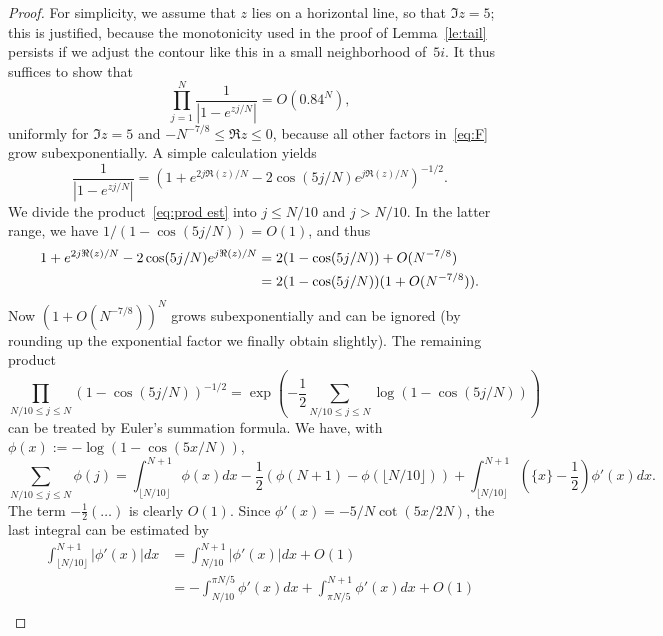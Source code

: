 \documentclass[a4paper]{amsart}
\begin{document}
\begin{proof}
For simplicity, we assume that $z$ lies on a horizontal line,
so that $\Im z=5$; this is justified, because the monotonicity
used in the proof of Lemma~\ref{le:tail} persists if we adjust the contour like
this in a small neighborhood of~$5i$.
  It thus suffices to show that
  \begin{equation}\label{eq:prod est}
      \prod_{j=1}^N \frac{1}{|1-e^{z j/N}|} = O(0.84^N),
   \end{equation}
  uniformly for $\Im z=5$ and $-N^{-7/8} \leq \Re z \leq 0$,
  because all other factors in~\eqref{eq:F} grow subexponentially.
  A simple calculation yields
  \begin{equation}\label{eq:abs expl}
    \frac{1}{|1-e^{z j/N}|} = \left(1+  e^{2j \Re(z)/N} - 2\cos(5j/N)
    e^{j \Re(z)/N} \right)^{-1/2}.
  \end{equation}
  We divide the product~\eqref{eq:prod est}
  into $j\leq N/10$ and $j>N/10$. In the latter range,
  we have $1/(1-\cos(5j/N))=O(1)$, and thus
  \begin{align}
    1+  e^{2j \Re(z)/N} - 2\cos(5j/N) e^{j \Re(z)/N}
      &= 2(1-\cos(5j/N))+ O(N^{-7/8}) \notag \\
    &= 2(1-\cos(5j/N))(1+ O(N^{-7/8})). \label{eq:j big}
  \end{align}
  Now $(1+ O(N^{-7/8}))^N$ grows subexponentially and can be ignored (by rounding
  up the exponential factor we finally obtain slightly). The remaining product
  \begin{equation}\label{eq:prod sum}
    \prod_{N/10 \leq j\leq N}(1-\cos(5j/N))^{-1/2} =
    \exp\left(-\frac12 \sum_{N/10 \leq j\leq N} \log(1-\cos(5j/N)) \right)
  \end{equation}
  can be treated by Euler's summation formula.
  We have, with $\phi(x):=-\log(1-\cos(5x/N))$,
  \begin{equation}\label{eq:euler}
    \sum_{N/10 \leq j\leq N} \phi(j) = \int_{\lfloor N/10 \rfloor}^{N+1} \phi(x)dx
    -\frac12(\phi(N+1)-\phi(\lfloor N/10 \rfloor)) +
    \int_{\lfloor N/10 \rfloor}^{N+1}(\{x\}-\frac12)\phi'(x)dx.
  \end{equation}
  The term $-\tfrac12(\dots)$ is clearly $O(1)$.
  Since $\phi'(x) = -5/N \cot(5x/2N)$, the last integral can be estimated by
  \begin{align*}
    \int_{\lfloor N/10 \rfloor}^{N+1} | \phi'(x) | dx
    &= \int_{ N/10 }^{N+1} | \phi'(x) | dx  + O(1) \\
    &= -\int_{ N/10 }^{\pi N/5}\phi'(x) dx + \int_{\pi N/5}^{N+1}\phi'(x)dx +O(1) \\

\end{align*}
\end{proof}
\end{document}
